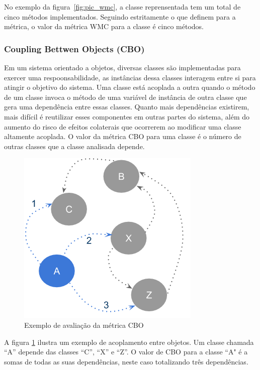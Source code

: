 \documentclass[conference]{IEEEtran}
\begin{document}
No exemplo da figura~\ref{fig:pic_wmc}, a classe reprensentada tem um total de
cinco métodos implementados. Seguindo estritamente o que \cite{cksuite}
definem para a métrica, o valor da métrica WMC para a classe é cinco métodos.


\subsubsection{\textbf{Coupling Bettwen Objects (CBO)}} Em um sistema orientado
a objetos, diversas classes são implementadas para exercer uma respoonsabilidade, as
instâncias dessa classes interagem entre si para atingir o objetivo do sistema.
Uma classe está acoplada a outra quando o método de um classe invoca o método de
uma variável de instância de outra classe que gera uma dependência entre essas
classes. Quanto mais dependências existirem, mais difícil é reutilizar esses
componentes em outras partes do sistema, além do aumento do risco de efeitos
colaterais que ocorrerem ao modificar uma classe altamente acoplada. O valor da
métrica CBO para uma classe é o número de outras classes que a classe analisada
depende.


\begin{figure}[htb]
	\begin{center}
		\includegraphics[scale=0.6]{img/pic_cbo.png}
	\end{center}
	\caption{\label{fig:pic_cbo}Exemplo de avaliação da métrica CBO}
	
\end{figure}

A figura \ref{fig:pic_cbo} ilustra um exemplo de acoplamento entre objetos. Um
classe chamada ``A'' depende das classes ``C'', ``X'' e ``Z''. O
valor de CBO para a classe ``A" é a somas de todas as suas
dependências, neste caso totalizando três dependências.
\end{document}
